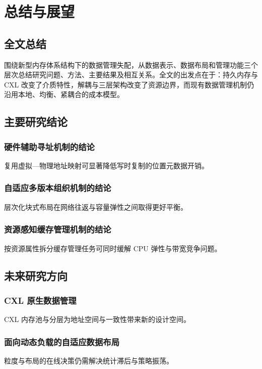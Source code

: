 \chapter{总结与展望}

\section{全文总结}
围绕新型内存体系结构下的数据管理失配，从数据表示、数据布局和管理功能三个层次总结研究问题、方法、主要结果及相互关系。全文的出发点在于：持久内存与 CXL 改变了介质特性\cite{izraelevitzBasic2019,cxlConsortium2025}，解耦与三层架构改变了资源边界\cite{caoPolardb2021,shanLeGo2018}，而现有数据管理机制仍沿用本地、均衡、紧耦合的成本模型\cite{stonebrakerOperating1981,binnigEnd2016}。
\section{主要研究结论}
\subsection{硬件辅助寻址机制的结论}
复用虚拟—物理地址映射可显著降低写时复制的位置元数据开销\cite{liuDudetm2017,liCtfs2022}。
\subsection{自适应多版本组织机制的结论}
层次化块式布局在网络往返与容量弹性之间取得更好平衡\cite{zhangMotor2024,caiEfficient2018}。
\subsection{资源感知缓存管理机制的结论}
按资源属性拆分缓存管理任务可同时缓解 CPU 弹性与带宽竞争问题\cite{caoPolardb2021,zhangTowards2021}。
\section{未来研究方向}
\subsection{CXL 原生数据管理}
CXL 内存池与分层为地址空间与一致性带来新的设计空间\cite{cxlConsortium2025,liPond2023,zhongManaging2024}。
\subsection{面向动态负载的自适应数据布局}
粒度与布局的在线决策仍需解决统计滞后与策略振荡\cite{zamanianChiller2020}。
